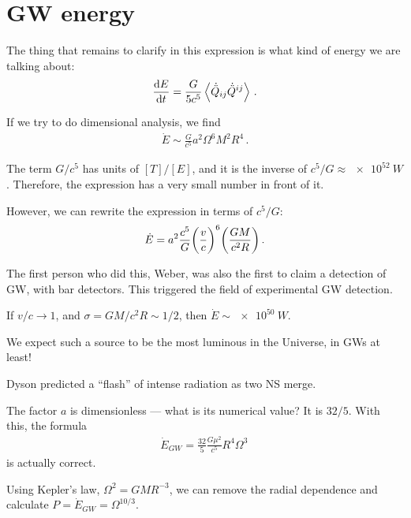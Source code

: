 \documentclass[main.tex]{subfiles}
\begin{document}
\section{GW energy}


The thing that remains to clarify in this expression is what kind of energy we are talking about:
%
\begin{align}
\dv{E}{t} = \frac{G}{5 c^{5}} \expval{ \dot{\ddot{Q}}_{ij} \dot{\ddot{Q}}^{ij}}
\,.
\end{align}

If we try to do dimensional analysis, we find 
%
\begin{align}
\dot{E} \sim \frac{G}{c^{5}} a^2 \Omega^{6} M^2 R^{4}
\,.
\end{align}

The term \(G / c^{5}\) has units of \([T] / [E]\), and it is the inverse of \(c^{5} / G \approx \SI{e52}{W}\).
Therefore, the expression has a very small number in front of it. 

However, we can rewrite the expression in terms of \(c^{5} / G\): 
%
\begin{align}
\dot{E} = a^2 \frac{c^{5}}{G} \qty( \frac{v}{c})^{6} \qty( \frac{GM}{c^2 R})
\,.
\end{align}

The first person who did this, Weber, was also the first to claim a detection of GW, with bar detectors. 
This triggered the field of experimental GW detection. 

If \(v/c \to 1\), and \(\sigma = GM / c^2R \sim 1/2\), then \(\dot{E} \sim \SI{e50}{W}\).

We expect such a source to be the most luminous in the Universe, in GWs at least! 

Dyson predicted a ``flash'' of intense radiation as two NS merge. 

The factor \(a\) is dimensionless --- what is its numerical value? It is \(32/ 5\). With this, the formula 
%
\begin{align}
\dot{E}_{GW} = \frac{32}{5} \frac{G \mu^2}{c^{5}} R^{4} \Omega^3
\,
\end{align}
%
is actually correct. 

Using Kepler's law, \(\Omega^2 = GM R^{-3}\), we can remove the radial dependence and calculate \(P = \dot{E}_{GW} = \Omega^{10/3}\). 
\end{document}
